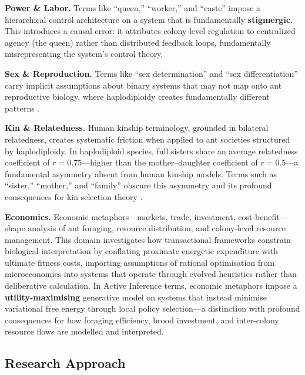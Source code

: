\documentclass[
]{article}
\numberwithin{equation}{section}
\begin{document}
\textbf{Power \& Labor.} Terms like ``queen,'' ``worker,'' and ``caste''
impose a hierarchical control architecture on a system that is
fundamentally \textbf{stigmergic}. This introduces a causal error: it
attributes colony-level regulation to centralized agency (the queen)
rather than distributed feedback loops, fundamentally misrepresenting
the system's control theory.

\textbf{Sex \& Reproduction.} Terms like ``sex determination'' and ``sex
differentiation'' carry implicit assumptions about binary systems that
may not map onto ant reproductive biology, where haplodiploidy creates
fundamentally different patterns \cite{chandra2021epigenetics}.

\textbf{Kin \& Relatedness.} Human kinship terminology, grounded in
bilateral relatedness, creates systematic friction when applied to ant
societies structured by haplodiploidy. In haplodiploid species, full
sisters share an average relatedness coefficient of
\(r = 0.75\)---higher than the mother--daughter coefficient of
\(r = 0.5\)---a fundamental asymmetry absent from human kinship models.
Terms such as ``sister,'' ``mother,'' and ``family'' obscure this
asymmetry and its profound consequences for kin selection theory
\cite{chandra2021epigenetics}.

\textbf{Economics.} Economic metaphors---markets, trade, investment,
cost-benefit---shape analysis of ant foraging, resource distribution,
and colony-level resource management. This domain investigates how
transactional frameworks constrain biological interpretation by
conflating proximate energetic expenditure with ultimate fitness costs,
importing assumptions of rational optimisation from microeconomics into
systems that operate through evolved heuristics rather than deliberative
calculation. In Active Inference terms, economic metaphors impose a
\textbf{utility-maximising} generative model on systems that instead
minimise variational free energy through local policy selection---a
distinction with profound consequences for how foraging efficiency,
brood investment, and inter-colony resource flows are modelled and
interpreted.

\subsection{Research Approach}\label{research-approach}
\end{document}
